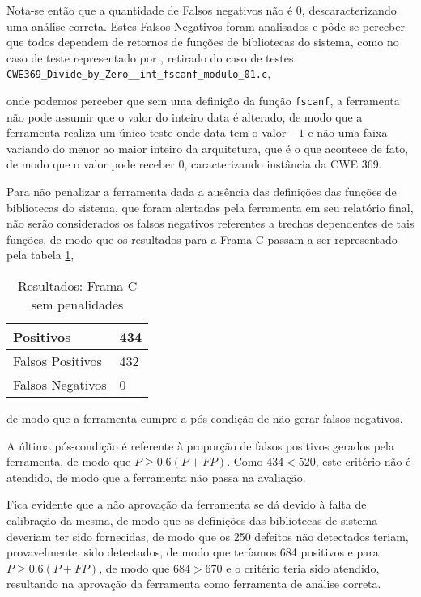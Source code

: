 Nota-se então que a quantidade de Falsos negativos não é 0, descaracterizando uma análise correta. Estes Falsos Negativos foram analisados e pôde-se perceber que todos dependem de retornos de funções de bibliotecas do sistema, como no caso de teste representado por , retirado do caso de testes \lstinline{CWE369_Divide_by_Zero__int_fscanf_modulo_01.c},
      
      onde podemos perceber que sem uma definição da função \lstinline{fscanf}, a ferramenta não pode assumir que o valor do inteiro data é alterado, de modo que a ferramenta realiza um único teste onde data tem o valor $-1$ e não uma faixa variando do menor ao maior inteiro da arquitetura, que é o que acontece de fato, de modo que o valor pode receber 0, caracterizando instância da CWE 369. 

      Para não penalizar a ferramenta dada a ausência das definições das funções de bibliotecas do sistema, que foram alertadas pela ferramenta em seu relatório final, não serão considerados os falsos negativos referentes a trechos dependentes de tais funções, de modo que os resultados para a Frama-C passam a ser representado pela tabela \ref{tabela_framac2},
\begin{table}[h]
  \centering
\begin{tabular}{| l | l |}
  \hline
  Positivos & 434 \\ \hline
  Falsos Positivos & 432 \\ \hline
  Falsos Negativos & 0 \\
  \hline
\end{tabular}
\caption{Resultados: Frama-C sem penalidades}
\label{tabela_framac2}
\end{table}
      de modo que a ferramenta cumpre a pós-condição de não gerar falsos negativos.

      A última pós-condição é referente à proporção de falsos positivos gerados pela ferramenta, de modo que
      $P \geq 0.6(P + FP)$.
      Como 
      $434 < 520$,
      este critério não é atendido, de modo que a ferramenta não passa na avaliação.

      Fica evidente que a não aprovação da ferramenta se dá devido à falta de calibração da mesma, de modo que as definições das bibliotecas de sistema deveriam ter sido fornecidas, de modo que os 250 defeitos não detectados teriam, provavelmente, sido detectados, de modo que teríamos 684 positivos e para
      $P \geq 0.6(P + FP)$,
      de modo que
      $684 > 670$
      e o critério teria sido atendido, resultando na aprovação da ferramenta como ferramenta de análise correta.
